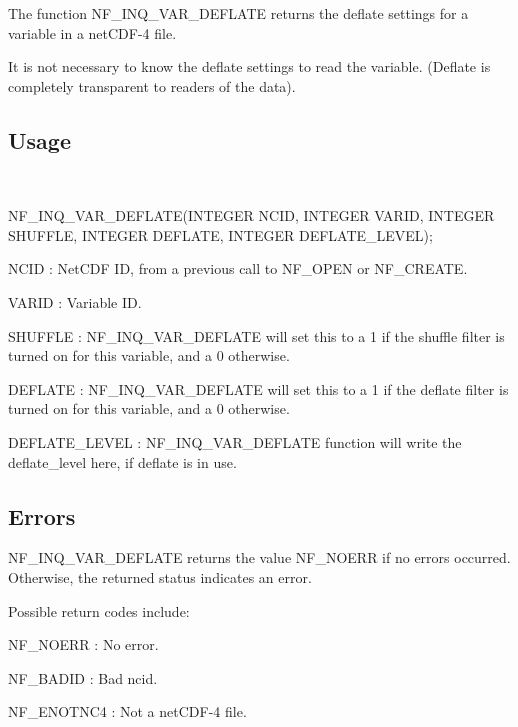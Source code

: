 The function N\+F\+\_\+\+I\+N\+Q\+\_\+\+V\+A\+R\+\_\+\+D\+E\+F\+L\+A\+TE returns the deflate settings for a variable in a net\+C\+D\+F-\/4 file.

It is not necessary to know the deflate settings to read the variable. (Deflate is completely transparent to readers of the data).

\subsection*{Usage }

 

N\+F\+\_\+\+I\+N\+Q\+\_\+\+V\+A\+R\+\_\+\+D\+E\+F\+L\+A\+TE(I\+N\+T\+E\+G\+ER N\+C\+ID, I\+N\+T\+E\+G\+ER V\+A\+R\+ID, I\+N\+T\+E\+G\+ER S\+H\+U\+F\+F\+LE, I\+N\+T\+E\+G\+ER D\+E\+F\+L\+A\+TE, I\+N\+T\+E\+G\+ER D\+E\+F\+L\+A\+T\+E\+\_\+\+L\+E\+V\+EL);

{\ttfamily N\+C\+ID} \+: Net\+C\+DF ID, from a previous call to N\+F\+\_\+\+O\+P\+EN or N\+F\+\_\+\+C\+R\+E\+A\+TE.

{\ttfamily V\+A\+R\+ID} \+: Variable ID.

{\ttfamily S\+H\+U\+F\+F\+LE} \+: N\+F\+\_\+\+I\+N\+Q\+\_\+\+V\+A\+R\+\_\+\+D\+E\+F\+L\+A\+TE will set this to a 1 if the shuffle filter is turned on for this variable, and a 0 otherwise.

{\ttfamily D\+E\+F\+L\+A\+TE} \+: N\+F\+\_\+\+I\+N\+Q\+\_\+\+V\+A\+R\+\_\+\+D\+E\+F\+L\+A\+TE will set this to a 1 if the deflate filter is turned on for this variable, and a 0 otherwise.

{\ttfamily D\+E\+F\+L\+A\+T\+E\+\_\+\+L\+E\+V\+EL} \+: N\+F\+\_\+\+I\+N\+Q\+\_\+\+V\+A\+R\+\_\+\+D\+E\+F\+L\+A\+TE function will write the deflate\+\_\+level here, if deflate is in use.

\subsection*{Errors }

N\+F\+\_\+\+I\+N\+Q\+\_\+\+V\+A\+R\+\_\+\+D\+E\+F\+L\+A\+TE returns the value N\+F\+\_\+\+N\+O\+E\+RR if no errors occurred. Otherwise, the returned status indicates an error.

Possible return codes include\+:

{\ttfamily N\+F\+\_\+\+N\+O\+E\+RR} \+: No error.

{\ttfamily N\+F\+\_\+\+B\+A\+D\+ID} \+: Bad ncid.

{\ttfamily N\+F\+\_\+\+E\+N\+O\+T\+N\+C4} \+: Not a net\+C\+D\+F-\/4 file.

